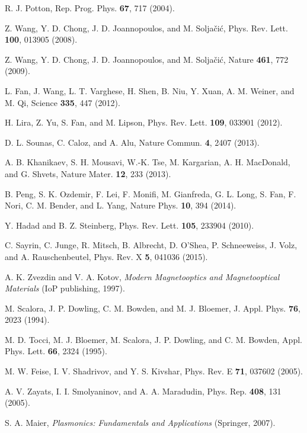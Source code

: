 \documentclass[9pt,twocolumn,twoside]{osajnl}
\begin{document}
\begin{thebibliography}{1}

{R. J. Potton, Rep. Prog. Phys. {\bf 67}, 717 (2004).}

{Z. Wang, Y. D. Chong, J. D. Joannopoulos, and M. Solja\v{c}i\'{c}, Phys. Rev. Lett. {\bf 100}, 013905 (2008).}

{Z. Wang, Y. D. Chong, J. D. Joannopoulos, and M. Solja\v{c}i\'{c}, Nature {\bf 461}, 772 (2009).}

{L. Fan, J. Wang, L. T. Varghese, H. Shen, B. Niu, Y. Xuan, A. M. Weiner, and M. Qi, Science {\bf 335}, 447 (2012).}

{H. Lira, Z. Yu, S. Fan, and M. Lipson, Phys. Rev. Lett. {\bf 109}, 033901 (2012).}

{D. L. Sounas, C. Caloz, and A. Alu, Nature Commun. {\bf 4}, 2407 (2013).}

{A. B. Khanikaev, S. H. Mousavi, W.-K. Tse, M. Kargarian, A. H. MacDonald, and G. Shvets, Nature Mater. {\bf 12}, 233 (2013).}

{B. Peng, S. K. Ozdemir, F. Lei, F. Monifi, M. Gianfreda, G. L. Long, S. Fan, F. Nori, C. M. Bender, and L. Yang, Nature Phys. {\bf 10}, 394 (2014).}

{Y. Hadad and B. Z. Steinberg, Phys. Rev. Lett. {\bf 105}, 233904 (2010).}

{C. Sayrin, C. Junge, R. Mitsch, B. Albrecht, D. O'Shea, P. Schneeweiss, J. Volz, and A. Rauschenbeutel, Phys. Rev. X {\bf 5}, 041036 (2015).}

{A. K. Zvezdin and V. A. Kotov, {\it Modern Magnetooptics and Magnetooptical Materials} (IoP publishing, 1997).}

{M. Scalora, J. P. Dowling, C. M. Bowden, and M. J. Bloemer, J. Appl. Phys. {\bf 76}, 2023 (1994).}

{M. D. Tocci, M. J. Bloemer, M. Scalora, J. P. Dowling, and C. M. Bowden, Appl. Phys. Lett. {\bf 66}, 2324 (1995).}

{M. W. Feise, I. V. Shadrivov, and Y. S. Kivshar, Phys. Rev. E {\bf 71}, 037602 (2005).}

{A. V. Zayats, I. I. Smolyaninov, and A. A. Maradudin, Phys. Rep. {\bf 408}, 131 (2005).}

{S. A. Maier, {\it Plasmonics: Fundamentals and Applications} (Springer, 2007).}


\end{thebibliography}
\end{document}
